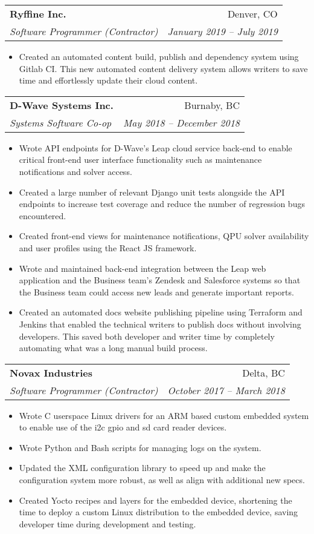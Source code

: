 \documentclass[letterpaper,11pt]{article}
\makeatletter
\newcommand{\resumeItem}[2]{
  \item\small{
    \textbf{#1}{#2 \vspace{-2pt}}
  }
}
\newcommand{\resumeSubheading}[4]{
  \vspace{-1pt}\item
    \begin{tabular*}{0.97\textwidth}[t]{l@{\extracolsep{\fill}}r}
      \textbf{#1} & #2 \\
      \textit{\small#3} & \textit{\small #4} \\
    \end{tabular*}\vspace{-5pt}
}
\newcommand{\resumeItemListStart}{\begin{itemize}}
\newcommand{\resumeItemListEnd}{\end{itemize}\vspace{-5pt}}
\makeatother
\begin{document}
    \resumeSubheading
      {Ryffine Inc.}{Denver, CO}
      {Software Programmer (Contractor)}{January 2019 -- July 2019}
      \resumeItemListStart
        \resumeItem{} {Created an automated content build, publish and dependency system using Gitlab CI. This new automated content delivery system allows writers to save time and effortlessly update their cloud content.}
      \resumeItemListEnd

    \resumeSubheading
      {D-Wave Systems Inc.}{Burnaby, BC}
      {Systems Software Co-op}{May 2018 -- December 2018}
      \resumeItemListStart
        \resumeItem{} {Wrote API endpoints for D-Wave's Leap cloud service back-end to enable critical front-end user interface functionality such as maintenance notifications and solver access.}
        \resumeItem{} {Created a large number of relevant Django unit tests alongside the API endpoints to increase test coverage and reduce the number of regression bugs encountered.}
        \resumeItem{} {Created front-end views for maintenance notifications, QPU solver availability and user profiles using the React JS framework.}
        \resumeItem{} {Wrote and maintained back-end integration between the Leap web application and the Business team's Zendesk and Salesforce systems so that the Business team could access new leads and generate important reports.}
        \resumeItem{} {Created an automated docs website publishing pipeline using Terraform and Jenkins that enabled the technical writers to publish docs without involving developers. This saved both developer and writer time by completely automating what was a long manual build process.}
      \resumeItemListEnd

    \resumeSubheading
      {Novax Industries}{Delta, BC}
      {Software Programmer (Contractor)}{October 2017 -- March 2018}
      \resumeItemListStart
        \resumeItem{} {Wrote C userspace Linux drivers for an ARM based custom embedded system to enable use of the i2c gpio and sd card reader devices.}
        \resumeItem{} {Wrote Python and Bash scripts for managing logs on the system.}
        \resumeItem{} {Updated the XML configuration library to speed up and make the configuration system more robust, as well as align with additional new specs.}
        \resumeItem{} {Created Yocto recipes and layers for the embedded device, shortening the time to deploy a custom Linux distribution to the embedded device, saving developer time during development and testing.}
      \resumeItemListEnd
\end{document}
